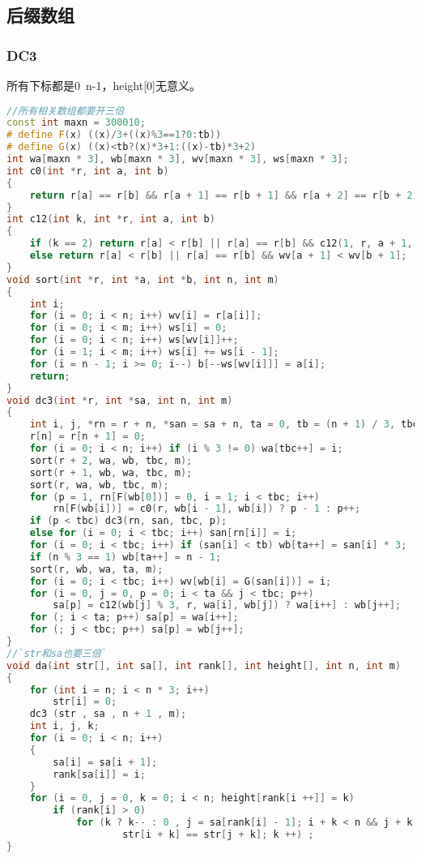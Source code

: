\subsection{后缀数组}
    \subsubsection{DC3}
        所有下标都是0~n-1，height[0]无意义。
        \begin{lstlisting}[language=c++]
//所有相关数组都要开三倍
const int maxn = 300010;
# define F(x) ((x)/3+((x)%3==1?0:tb))
# define G(x) ((x)<tb?(x)*3+1:((x)-tb)*3+2)
int wa[maxn * 3], wb[maxn * 3], wv[maxn * 3], ws[maxn * 3];
int c0(int *r, int a, int b)
{
    return r[a] == r[b] && r[a + 1] == r[b + 1] && r[a + 2] == r[b + 2];
}
int c12(int k, int *r, int a, int b)
{
    if (k == 2) return r[a] < r[b] || r[a] == r[b] && c12(1, r, a + 1, b + 1);
    else return r[a] < r[b] || r[a] == r[b] && wv[a + 1] < wv[b + 1];
}
void sort(int *r, int *a, int *b, int n, int m)
{
    int i;
    for (i = 0; i < n; i++) wv[i] = r[a[i]];
    for (i = 0; i < m; i++) ws[i] = 0;
    for (i = 0; i < n; i++) ws[wv[i]]++;
    for (i = 1; i < m; i++) ws[i] += ws[i - 1];
    for (i = n - 1; i >= 0; i--) b[--ws[wv[i]]] = a[i];
    return;
}
void dc3(int *r, int *sa, int n, int m)
{
    int i, j, *rn = r + n, *san = sa + n, ta = 0, tb = (n + 1) / 3, tbc = 0, p;
    r[n] = r[n + 1] = 0;
    for (i = 0; i < n; i++) if (i % 3 != 0) wa[tbc++] = i;
    sort(r + 2, wa, wb, tbc, m);
    sort(r + 1, wb, wa, tbc, m);
    sort(r, wa, wb, tbc, m);
    for (p = 1, rn[F(wb[0])] = 0, i = 1; i < tbc; i++)
        rn[F(wb[i])] = c0(r, wb[i - 1], wb[i]) ? p - 1 : p++;
    if (p < tbc) dc3(rn, san, tbc, p);
    else for (i = 0; i < tbc; i++) san[rn[i]] = i;
    for (i = 0; i < tbc; i++) if (san[i] < tb) wb[ta++] = san[i] * 3;
    if (n % 3 == 1) wb[ta++] = n - 1;
    sort(r, wb, wa, ta, m);
    for (i = 0; i < tbc; i++) wv[wb[i] = G(san[i])] = i;
    for (i = 0, j = 0, p = 0; i < ta && j < tbc; p++)
        sa[p] = c12(wb[j] % 3, r, wa[i], wb[j]) ? wa[i++] : wb[j++];
    for (; i < ta; p++) sa[p] = wa[i++];
    for (; j < tbc; p++) sa[p] = wb[j++];
}
//`str和sa也要三倍`
void da(int str[], int sa[], int rank[], int height[], int n, int m)
{
    for (int i = n; i < n * 3; i++)
        str[i] = 0;
    dc3 (str , sa , n + 1 , m);
    int i, j, k;
    for (i = 0; i < n; i++)
    {
        sa[i] = sa[i + 1];
        rank[sa[i]] = i;
    }
    for (i = 0, j = 0, k = 0; i < n; height[rank[i ++]] = k)
        if (rank[i] > 0)
            for (k ? k-- : 0 , j = sa[rank[i] - 1]; i + k < n && j + k < n &&
                    str[i + k] == str[j + k]; k ++) ;
}
        \end{lstlisting}
        
